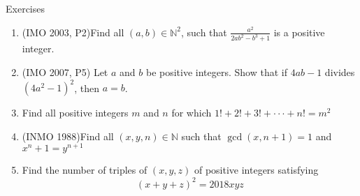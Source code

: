 \begin{xcb}{Exercises}
\begin{enumerate}
\item (IMO 2003, P2)Find all $(a,b)\in \mathbb{N}^2$, such that $\frac{a^2}{2ab^2-b^3+1}$ is a positive integer.\\
\item (IMO 2007, P5) Let $a$ and $b$ be positive integers. Show that if $4ab-1$ divides $(4a^2 - 1)^2$, then $a = b$.
\item Find all positive integers $m$ and $n$ for which $1! + 2! + 3! + · · · + n! = m^2$
\item (INMO 1988)Find all $(x, y, n) \in \mathbb{N}$
such that $\gcd(x, n + 1) = 1$ and $x^n+1=y^{n+1}$
\item Find the number of triples of $(x,y,z)$ of positive integers satisfying
\[(x+y+z)^2=2018xyz\]
\end{enumerate}
\end{xcb}